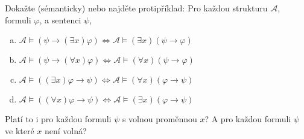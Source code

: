 \begin{problem}
\begin{solution}
    \end{solution}

\end{problem}


\begin{problem}

    Dokažte (sémanticky) nebo najděte protipříklad: Pro každou strukturu $\mathcal{A}$, formuli $\varphi$, a sentenci $\psi$,
    \begin{enumerate}[(a)]
    \item $\mathcal{A}\models (\psi \to (\exists x)\varphi) \Leftrightarrow \mathcal{A}\models (\exists x)(\psi \to \varphi)$
    \item $\mathcal{A}\models (\psi \to (\forall x)\varphi) \Leftrightarrow \mathcal{A}\models (\forall x)(\psi \to \varphi)$
    \item $\mathcal{A}\models ((\exists x)\varphi \to \psi) \Leftrightarrow \mathcal{A}\models (\forall x)(\varphi \to \psi)$
    \item $\mathcal{A}\models ((\forall x)\varphi \to \psi ) \Leftrightarrow \mathcal{A}\models (\exists x)(\varphi \to \psi)$
    \end{enumerate}
    Platí to i pro každou formuli $\psi$ s volnou proměnnou $x$? A pro každou formuli $\psi$ ve které $x$ není volná?

    \begin{solution}


\end{solution}
\end{problem}
